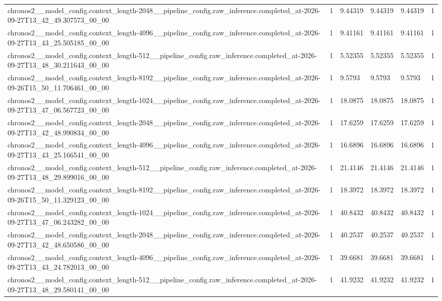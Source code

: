 \begin{tabular}{llllll}
chronos2\_\_model\_config.context\_length-2048\_\_pipeline\_config.raw\_inference.completed\_at-2026-09-27T13\_42\_49.307573\_00\_00 & 1 & 9.44319 & 9.44319 & 9.44319 & 1 \\
chronos2\_\_model\_config.context\_length-4096\_\_pipeline\_config.raw\_inference.completed\_at-2026-09-27T13\_43\_25.505185\_00\_00 & 1 & 9.41161 & 9.41161 & 9.41161 & 1 \\
chronos2\_\_model\_config.context\_length-512\_\_pipeline\_config.raw\_inference.completed\_at-2026-09-27T13\_48\_30.211643\_00\_00 & 1 & 5.52355 & 5.52355 & 5.52355 & 1 \\
chronos2\_\_model\_config.context\_length-8192\_\_pipeline\_config.raw\_inference.completed\_at-2026-09-26T15\_50\_11.706461\_00\_00 & 1 & 9.5793 & 9.5793 & 9.5793 & 1 \\
chronos2\_\_model\_config.context\_length-1024\_\_pipeline\_config.raw\_inference.completed\_at-2026-09-27T13\_47\_06.567723\_00\_00 & 1 & 18.0875 & 18.0875 & 18.0875 & 1 \\
chronos2\_\_model\_config.context\_length-2048\_\_pipeline\_config.raw\_inference.completed\_at-2026-09-27T13\_42\_48.990834\_00\_00 & 1 & 17.6259 & 17.6259 & 17.6259 & 1 \\
chronos2\_\_model\_config.context\_length-4096\_\_pipeline\_config.raw\_inference.completed\_at-2026-09-27T13\_43\_25.166541\_00\_00 & 1 & 16.6896 & 16.6896 & 16.6896 & 1 \\
chronos2\_\_model\_config.context\_length-512\_\_pipeline\_config.raw\_inference.completed\_at-2026-09-27T13\_48\_29.899016\_00\_00 & 1 & 21.4146 & 21.4146 & 21.4146 & 1 \\
chronos2\_\_model\_config.context\_length-8192\_\_pipeline\_config.raw\_inference.completed\_at-2026-09-26T15\_50\_11.329123\_00\_00 & 1 & 18.3972 & 18.3972 & 18.3972 & 1 \\
chronos2\_\_model\_config.context\_length-1024\_\_pipeline\_config.raw\_inference.completed\_at-2026-09-27T13\_47\_06.243282\_00\_00 & 1 & 40.8432 & 40.8432 & 40.8432 & 1 \\
chronos2\_\_model\_config.context\_length-2048\_\_pipeline\_config.raw\_inference.completed\_at-2026-09-27T13\_42\_48.650586\_00\_00 & 1 & 40.2537 & 40.2537 & 40.2537 & 1 \\
chronos2\_\_model\_config.context\_length-4096\_\_pipeline\_config.raw\_inference.completed\_at-2026-09-27T13\_43\_24.782013\_00\_00 & 1 & 39.6681 & 39.6681 & 39.6681 & 1 \\
chronos2\_\_model\_config.context\_length-512\_\_pipeline\_config.raw\_inference.completed\_at-2026-09-27T13\_48\_29.580141\_00\_00 & 1 & 41.9232 & 41.9232 & 41.9232 & 1 \\

\end{tabular}
